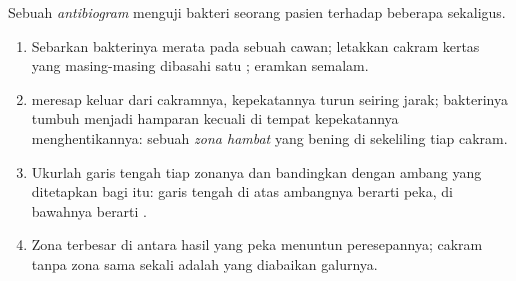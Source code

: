 \begin{method}\label{met:g11:antibiotic-resistance:antibiogram}
Sebuah \emph{antibiogram} menguji bakteri seorang pasien terhadap
beberapa  sekaligus.
\begin{enumerate}
  \item Sebarkan bakterinya merata pada sebuah cawan; letakkan cakram
        kertas yang masing-masing dibasahi satu ; eramkan
        semalam.
  \item {} meresap keluar dari cakramnya, kepekatannya turun
        seiring jarak; bakterinya tumbuh menjadi hamparan kecuali di
        tempat kepekatannya menghentikannya: sebuah \emph{zona hambat}
        yang bening di sekeliling tiap cakram.
  \item Ukurlah garis tengah tiap zonanya dan bandingkan dengan ambang
        yang ditetapkan bagi  itu: garis tengah di atas
        ambangnya berarti peka, di bawahnya berarti .
  \item Zona terbesar di antara hasil yang peka menuntun peresepannya;
        cakram tanpa zona sama sekali adalah  yang diabaikan
        galurnya.
\end{enumerate}
\end{method}

